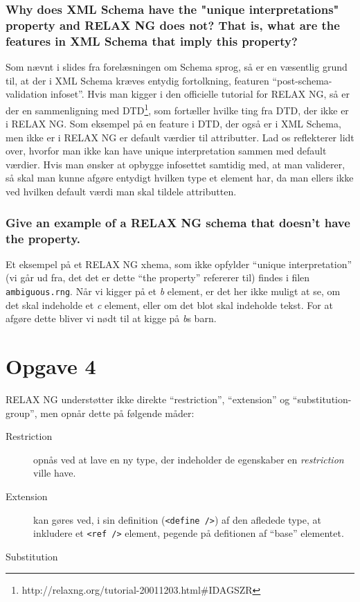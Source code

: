 \documentclass[a4paper,10pt]{article}
\begin{document}
\subsubsection*{Why does XML Schema have the "unique interpretations" property and RELAX NG does not? That is, what are the features in XML Schema that imply this property?} 
Som nævnt i slides fra forelæsningen om Schema sprog, så er en væsentlig grund til, at der i XML Schema kræves entydig fortolkning, featuren ``post-schema-validation infoset''. Hvis man kigger i den officielle tutorial for RELAX NG, så er der en sammenligning med DTD\footnote{http://relaxng.org/tutorial-20011203.html\#IDAGSZR}, som fortæller hvilke ting fra DTD, der ikke er i RELAX NG. Som eksempel på en feature i DTD, der også er i XML Schema, men ikke er i RELAX NG er default værdier til attributter. Lad os reflekterer lidt over, hvorfor  man ikke kan have unique interpretation sammen med default værdier. Hvis man ønsker at opbygge infosettet samtidig med, at man validerer, så skal man kunne afgøre entydigt hvilken type et element har, da man ellers ikke ved hvilken default værdi man skal tildele attributten.

\subsubsection*{Give an example of a RELAX NG schema that doesn't have the property.}
Et eksempel på et RELAX NG xhema, som ikke opfylder ``unique interpretation'' (vi går ud fra, det det er dette ``the property'' refererer til) findes i filen \texttt{ambiguous.rng}. Når vi kigger på et \emph{b} element, er det her ikke muligt at se, om det skal indeholde et \emph{c} element, eller om det blot skal indeholde tekst. For at afgøre dette bliver vi nødt til at kigge på \emph{b}s barn.

\section*{Opgave 4}
RELAX NG understøtter ikke direkte ``restriction'', ``extension'' og ``substitution-group'', men opnår dette på følgende måder:
\begin{description}
\item[Restriction] opnås ved at lave en ny type, der indeholder de egenskaber en \textit{restriction} ville have. 
\item[Extension] kan gøres ved, i sin definition (\texttt{<define />}) af den afledede type, at inkludere et \texttt{<ref />} element, pegende på defitionen af ``base'' elementet. 
\item[Substitution]  
\end{description} 
\end{document}
